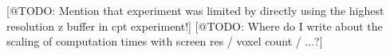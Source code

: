 [@TODO: Mention that experiment was limited by directly using the highest resolution z buffer in cpt experiment!]
[@TODO: Where do I write about the scaling of computation times with screen res / voxel count / ...?]




%
%
%
